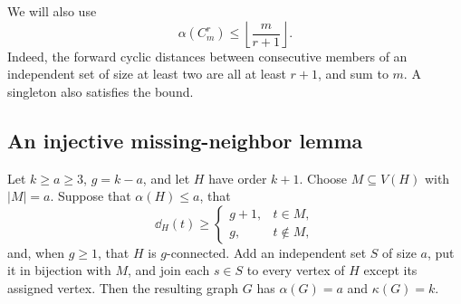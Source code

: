 We will also use
\begin{equation}\label{eq:cycle-alpha}
\alpha(C_m^r)\le\left\lfloor\frac{m}{r+1}\right\rfloor.
\end{equation}
Indeed, the forward cyclic distances between consecutive members of an independent set of size at least two are all at least $r+1$, and sum to $m$.
A singleton also satisfies the bound.

\subsection{An injective missing-neighbor lemma}

\begin{lemma}\label{lem:lift}
Let $k\ge a\ge3$, $g=k-a$, and let $H$ have order $k+1$.
Choose $M\subseteq V(H)$ with $|M|=a$. Suppose that $\alpha(H)\le a$, that
\begin{equation}
\dd_H(t)\ge
\begin{cases}g+1,&t\in M,\\g,&t\notin M,\end{cases}
\end{equation}
and, when $g\ge1$, that $H$ is $g$-connected.
Add an independent set $S$ of size $a$, put it in bijection with $M$, and join each $s\in S$ to every vertex of $H$ except its assigned vertex.
Then the resulting graph $G$ has $\alpha(G)=a$ and $\kappa(G)=k$.
\end{lemma}
